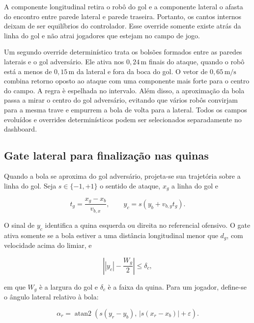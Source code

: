 \documentclass[12pt,a4paper]{article}
\begin{document}
A componente longitudinal retira o rob\^o do gol e a componente lateral o afasta
do encontro entre parede lateral e parede traseira. Portanto, os cantos internos
deixam de ser equil\'ibrios do controlador. Esse override somente existe atr\'as
da linha do gol e n\~ao atrai jogadores que estejam no campo de jogo.

Um segundo override determin\'istico trata os bols\~oes formados entre as paredes
laterais e o gol advers\'ario. Ele ativa nos $0{,}24\,\mathrm{m}$ finais do ataque,
quando o rob\^o est\'a a menos de $0{,}15\,\mathrm{m}$ da lateral e fora da boca do
gol. O vetor de $0{,}65\,\mathrm{m/s}$ combina retorno oposto ao ataque com uma
componente mais forte para o centro do campo. A regra \`e espelhada no intervalo.
Al\'em disso, a aproxima\c{c}\~ao da bola passa a mirar o centro do gol advers\'ario,
evitando que v\'arios rob\^os convirjam para a mesma trave e empurrem a bola de
volta para a lateral. Todos os campos evolu\'idos e overrides determin\'isticos
podem ser selecionados separadamente no dashboard.

\subsection{Gate lateral para finaliza\c{c}\~ao nas quinas}

Quando a bola se aproxima do gol advers\'ario, projeta-se sua trajet\'oria sobre
a linha do gol. Seja $s\in\{-1,+1\}$ o sentido de ataque, $x_g$ a linha do gol e

\begin{equation}
 t_g=\frac{x_g-x_b}{v_{b,x}},\qquad
 y_c=s(y_b+v_{b,y}t_g).
\end{equation}

O sinal de $y_c$ identifica a quina esquerda ou direita no referencial ofensivo.
O gate ativa somente se a bola estiver a uma dist\^ancia longitudinal menor que
$d_g$, com velocidade acima do limiar, e

\begin{equation}
 \left||y_c|-\frac{W_g}{2}\right|\leq\delta_c,
\end{equation}

em que $W_g$ \`e a largura do gol e $\delta_c$ \`e a faixa da quina. Para um
jogador, define-se o \^angulo lateral relativo \`a bola:

\begin{equation}
 \alpha_r=\operatorname{atan2}\!\left(s(y_r-y_b),\,|s(x_r-x_b)|+\varepsilon\right).
\end{equation}
\end{document}
